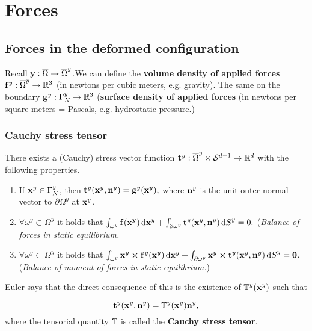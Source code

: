 \documentclass[reqno, a4paper]{article}
\begin{document}
\section{Forces}
\label{sec:forces}

\subsection{Forces in the deformed configuration}
\label{sec:forcesdeformed}

Recall $\vb{y}: \overline{\Omega} \to \overline{\Omega}^y$.We can define the \textbf{volume density of applied forces} $\vb{f}^y: \overline{\Omega}^y \to {\mathbb R}^3$ (in newtons per cubic meters, e.g. gravity).
The same on the boundary $\vb{g}^y : \Gamma^y_N \to {\mathbb R}^3$ (\textbf{surface density of applied forces} (in newtons per square meters = Pascals, e.g. hydrostatic pressure.)

\subsubsection{Cauchy stress tensor}
\label{sec:cstress}

\begin{lemma}
	There exists a (Cauchy) stress vector function $\vb{t}^y : \overline{\Omega}^y \times \mathcal{S}^{d-1} \to {\mathbb R}^d $ with the following properties.
\begin{enumerate}
	\item If $\vb{x}^y \in \Gamma^y_N$, then $\vb{t}^y(\vb{x}^y, \vb{n}^y) = \vb{g}^y(\vb{x}^y),$ where $\vb{n}^y$ is the unit outer normal vector to $\partial \Omega^y$ at $\vb{x}^y$.
	\item $\forall \omega^y \subset \Omega^y$ it holds that $\int_{\omega^y} \vb{f}(\vb{x^y})\dd{\vb{x}^y} + \int_{\partial \omega^y} \vb{t}^y(\vb{x}^y, \vb{n}^y)\dd{S}^y = 0.$ (\textit{Balance of forces in static equilibrium.}
	\item $\forall \omega^y \subset \Omega^y$ it holds that $\int_{\omega^y} \vb{x}^y \cross \vb{f}^y(\vb{x}^y) \dd{\vb{x}^y} + \int_{\partial \omega^y} \vb{x}^y \cross \vb{t}^y(\vb{x}^y, \vb{n}^y) \dd{S}^y = \vb{0}$. (\textit{Balance of moment of forces in static equilibrium.})
\end{enumerate}
Euler says that the direct consequence of this is the existence of $\mathbb{T}^y(\vb{x}^y)$ such that

\begin{equation}
	\label{eqn:cauchy}
\vb{t}^y(\vb{x}^y,\vb{n}^y) = \mathbb{T}^y(\vb{x}^y) \vb{n}^y, 
\end{equation}
where the tensorial quantity $ \mathbb{T}$ is called the \textbf{Cauchy stress tensor}.
\end{lemma}
\end{document}
